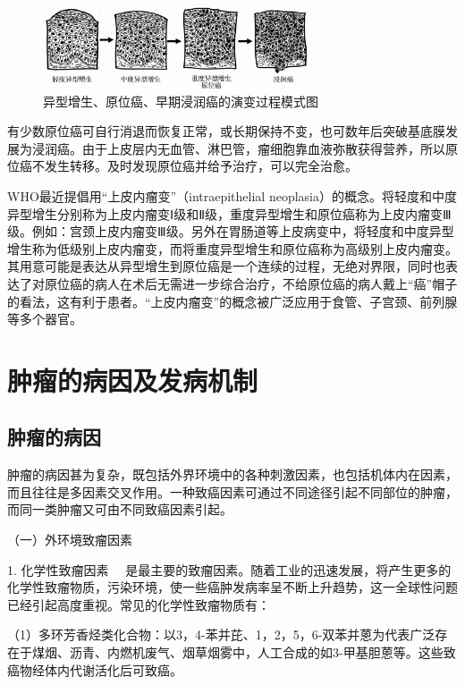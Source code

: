 \begin{figure}[!htbp]
 \centering
 \includegraphics[width=0.7\textwidth]{./images/Image00088.jpg}
 \caption{异型增生、原位癌、早期浸润癌的演变过程模式图}
 \label{fig5-19}
  \end{figure}

有少数原位癌可自行消退而恢复正常，或长期保持不变，也可数年后突破基底膜发展为浸润癌。由于上皮层内无血管、淋巴管，瘤细胞靠血液弥散获得营养，所以原位癌不发生转移。及时发现原位癌并给予治疗，可以完全治愈。

WHO最近提倡用“上皮内瘤变”（intraepithelial
neoplasia）的概念。将轻度和中度异型增生分别称为上皮内瘤变Ⅰ级和Ⅱ级，重度异型增生和原位癌称为上皮内瘤变Ⅲ级。例如：宫颈上皮内瘤变Ⅲ级。另外在胃肠道等上皮病变中，将轻度和中度异型增生称为低级别上皮内瘤变，而将重度异型增生和原位癌称为高级别上皮内瘤变。其用意可能是表达从异型增生到原位癌是一个连续的过程，无绝对界限，同时也表达了对原位癌的病人在术后无需进一步综合治疗，不给原位癌的病人戴上“癌”帽子的看法，这有利于患者。“上皮内瘤变”的概念被广泛应用于食管、子宫颈、前列腺等多个器官。

\section{肿瘤的病因及发病机制}

\subsection{肿瘤的病因}

肿瘤的病因甚为复杂，既包括外界环境中的各种刺激因素，也包括机体内在因素，而且往往是多因素交叉作用。一种致癌因素可通过不同途径引起不同部位的肿瘤，而同一类肿瘤又可由不同致癌因素引起。

{（一）外环境致瘤因素}

{1. 化学性致瘤因素}
　是最主要的致瘤因素。随着工业的迅速发展，将产生更多的化学性致瘤物质，污染环境，使一些癌肿发病率呈不断上升趋势，这一全球性问题已经引起高度重视。常见的化学性致瘤物质有：

（1）多环芳香烃类化合物：以3，4-苯并芘、1，2，5，6-双苯并蒽为代表广泛存在于煤烟、沥青、内燃机废气、烟草烟雾中，人工合成的如3-甲基胆蒽等。这些致癌物经体内代谢活化后可致癌。

